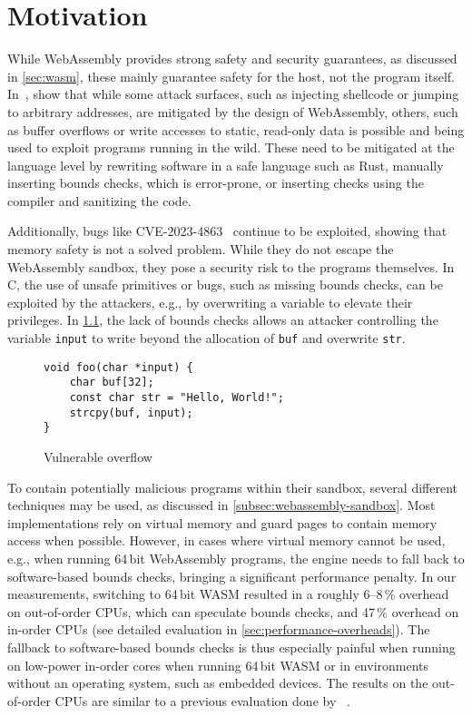 \chapter{Motivation}
\label{ch:motivation}

While WebAssembly provides strong safety and security guarantees, as discussed in \cref{sec:wasm}, these mainly guarantee safety for the host, not the program itself.
In~\cite{lehmann2020everything}, \citeauthor*{lehmann2020everything} show that while some attack surfaces, such as injecting shellcode or jumping to arbitrary addresses, are mitigated by the design of WebAssembly, others, such as buffer overflows or write accesses to static, read-only data is possible and being used to exploit programs running in the wild.
These need to be mitigated at the language level by rewriting software in a safe language such as Rust, manually inserting bounds checks, which is error-prone, or inserting checks using the compiler and sanitizing the code.

Additionally, bugs like {CVE-2023-4863}~\cite{CVE-2023-4863} continue to be exploited, showing that memory safety is not a solved problem.
While they do not escape the WebAssembly sandbox, they pose a security risk to the programs themselves.
In C, the use of unsafe primitives or bugs, such as missing bounds checks, can be exploited by the attackers, e.g., by overwriting a variable to elevate their privileges.
In \cref{fig:vulnerable-overflow}, the lack of bounds checks allows an attacker controlling the variable \texttt{input} to write beyond the allocation of \texttt{buf} and overwrite \texttt{str}.

\begin{figure}[h]
    \centering
    \begin{lstlisting}[frame=h,style=customc,label={lst:vulnerable-overflow}]
void foo(char *input) {
    char buf[32];
    const char str = "Hello, World!";
    strcpy(buf, input);
}
    \end{lstlisting}
    \caption{Vulnerable overflow}
    \label{fig:vulnerable-overflow}
\end{figure}

To contain potentially malicious programs within their sandbox, several different techniques may be used, as discussed in \cref{subsec:webassembly-sandbox}.
Most implementations rely on virtual memory and guard pages to contain memory access when possible.
However, in cases where virtual memory cannot be used, e.g., when running 64\,bit WebAssembly programs, the engine needs to fall back to software-based bounds checks, bringing a significant performance penalty.
In our measurements, switching to 64\,bit \ac{WASM} resulted in a roughly 6--8\,\% overhead on out-of-order CPUs, which can speculate bounds checks, and 47\,\% overhead on in-order CPUs (see detailed evaluation in \cref{sec:performance-overheads}).
The fallback to software-based bounds checks is thus especially painful when running on low-power in-order cores when running 64\,bit \ac{WASM} or in environments without an operating system, such as embedded devices.
The results on the out-of-order CPUs are similar to a previous evaluation done by \citeauthor*{szewczyk2022leaps}~\cite{szewczyk2022leaps}.

